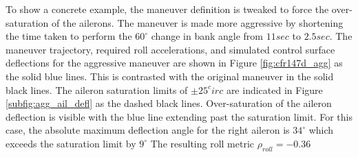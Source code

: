 To show a concrete example, the maneuver definition is tweaked to force the over-saturation of the ailerons.
The maneuver is made more aggressive by shortening the time taken to perform the $60^\circ$ change in bank angle from $11 sec$ to $2.5 sec$.
The maneuver trajectory, required roll accelerations, and simulated control surface deflections for the aggressive maneuver are shown in Figure \ref{fig:cfr147d_agg} as the solid blue lines. 
This is contrasted with the original maneuver in the solid black lines. 
The aileron saturation limits of $\pm 25^circ$ are indicated in Figure \ref{subfig:agg_ail_defl} as the dashed black lines. 
Over-saturation of the aileron deflection is visible with the blue line extending past the saturation limit. 
For this case, the absolute maximum deflection angle for the right aileron is $34^\circ$ which exceeds the saturation limit by $9^\circ$
The resulting roll metric $\rho_{roll} = -0.36$

